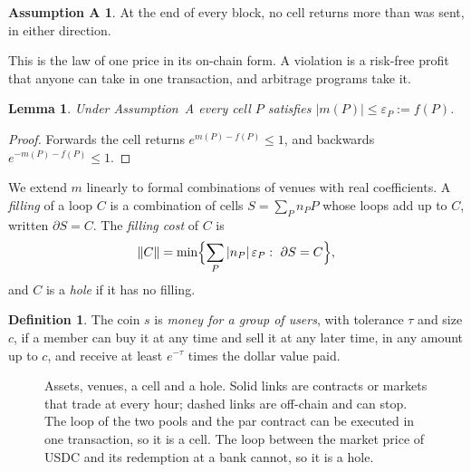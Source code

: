 \documentclass[11pt]{article}
\newtheorem{lemma}[theorem]{Lemma}
\theoremstyle{definition}
\newtheorem{definition}[theorem]{Definition}
\newtheorem*{assumption}{Assumption A}
\theoremstyle{remark}
\newcommand{\eps}{\varepsilon}
\newcommand{\fc}[1]{\lVert #1\rVert}
\begin{document}
\begin{assumption}
At the end of every block, no cell returns more than was sent, in either direction.
\end{assumption}

This is the law of one price in its on-chain form. A violation is a risk-free profit that anyone can take in one transaction, and arbitrage programs take it.

\begin{lemma}\label{lem:cell}
Under Assumption~A every cell $P$ satisfies $|m(P)|\le\eps_P:=f(P)$.
\end{lemma}

\begin{proof}
Forwards the cell returns $e^{m(P)-f(P)}\le1$, and backwards $e^{-m(P)-f(P)}\le1$.
\end{proof}

We extend $m$ linearly to formal combinations of venues with real coefficients. A \emph{filling} of a loop $C$ is a combination of cells $S=\sum_Pn_PP$ whose loops add up to $C$, written $\partial S=C$. The \emph{filling cost} of $C$ is
\[
  \fc{C}=\min\Bigl\{\sum_P|n_P|\,\eps_P:\ \partial S=C\Bigr\},
\]
and $C$ is a \emph{hole} if it has no filling.

\begin{definition}\label{def:money}
The coin $s$ is \emph{money for a group of users}, with tolerance $\tau$ and size $c$, if a member can buy it at any time and sell it at any later time, in any amount up to $c$, and receive at least $e^{-\tau}$ times the dollar value paid.
\end{definition}

\begin{figure}[t]
\centering
{}
\caption{Assets, venues, a cell and a hole. Solid links are contracts or markets that trade at every hour; dashed links are off-chain and can stop. The loop of the two pools and the par contract can be executed in one transaction, so it is a cell. The loop between the market price of USDC and its redemption at a bank cannot, so it is a hole.}
\label{fig:complex}
\end{figure}
\end{document}
